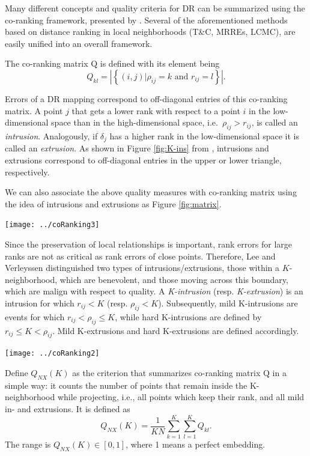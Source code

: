 \documentclass[11pt,a4paper,]{article}
\begin{document}
Many different concepts and quality criteria for DR can be summarized using the co-ranking framework, presented by \textcite{Lee2008-cx}. Several of the aforementioned methods based on distance ranking in local neighborhoods (T\&C, MRREs, LCMC), are easily unified into an overall framework.

The co-ranking matrix \(\mathrm{Q}\) is defined with its element being
\[
Q_{kl}=\left|\left\{(i, j) | \rho_{i j}=k \text { and } r_{i j}=l\right\}\right|.
\]

Errors of a DR mapping correspond to off-diagonal entries of this co-ranking matrix.
A point \(j\) that gets a lower rank with respect to a point \(i\) in the low-dimensional space than in the
high-dimensional space, i.e.~\(\rho_{ij} > r_{ij}\), is called an \emph{intrusion}. Analogously, if \(\delta_j\) has a higher rank in the low-dimensional space it is called an \emph{extrusion}. As shown in Figure \ref{fig:K-ins} from \textcite{Lee2008-cx}, intrusions and extrusions correspond to off-diagonal entries in the upper or lower triangle, respectively.

We can also associate the above quality measures with co-ranking matrix using the idea of intrusions and extrusions as Figure \ref{fig:matrix}.

\begin{center}\texttt{[image: ../coRanking3]} \end{center}

Since the preservation of local relationships is important, rank errors for large ranks are not as critical as rank errors of close points.
Therefore, Lee and Verleyssen distinguished two types of intrusions/extrusions, those within a \(K\)-neighborhood, which are benevolent, and those moving across this boundary, which are malign with respect to quality.
A \emph{K-intrusion} (resp. \emph{K-extrusion}) is an intrusion for which \(r_{ij} < K\) (resp. \(\rho_{ij} < K\)).
Subsequently, mild K-intrusions are events for which \(r_{ij} < \rho_{ij} \leq K\), while hard K-intrusions are defined by \(r_{ij} \leq K < \rho_{ij}\). Mild K-extrusions and hard K-extrusions are defined accordingly.

\begin{center}\texttt{[image: ../coRanking2]} \end{center}

Define \(Q_{NX}(K)\) as the criterion that summarizes co-ranking matrix \(\mathrm{Q}\) in a simple way: it counts the number of points that remain inside the K-neighborhood while projecting, i.e., all points which keep their rank, and all mild in- and extrusions. It is defined as
\[
Q_{NX}(K)=\frac{1}{K N} \sum_{k=1}^{K} \sum_{l=1}^{K} Q_{k l}.
\]
The range is \(Q_{N X}(K) \in[0,1]\), where 1 means a perfect embedding.
\end{document}
